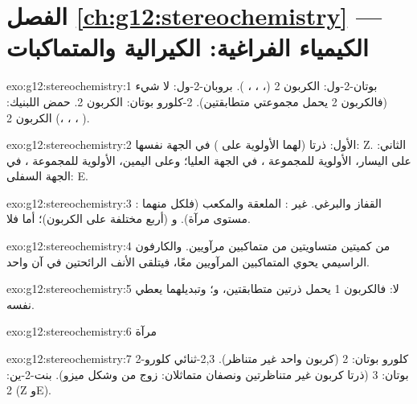 \section*{الفصل \ref{ch:g12:stereochemistry} --- الكيمياء الفراغية: الكيرالية والمتماكبات}

\begin{solution}{exo:g12:stereochemistry:1}
بوتان-2-ول: الكربون 2 (، ، ، ).
بروبان-2-ول: لا شيء (فالكربون 2 يحمل مجموعتي  متطابقتين).
2-كلورو بوتان: الكربون 2. حمض اللبنيك: الكربون 2 (، ،
، ).
\end{solution}

\begin{solution}{exo:g12:stereochemistry:2}
الأول: ذرتا  (لهما الأولوية على ) في الجهة نفسها: Z.
الثاني: على اليسار، الأولوية للمجموعة ، في الجهة العليا؛ وعلى اليمين،
الأولوية للمجموعة ، في الجهة السفلى: E.
\end{solution}

\begin{solution}{exo:g12:stereochemistry:3}
: القفاز والبرغي. غير : الملعقة والمكعب (فلكل منهما
مستوى مرآة). و  (أربع  مختلفة على الكربون)؛
أما  فلا.
\end{solution}

\begin{solution}{exo:g12:stereochemistry:4}
 من كميتين متساويتين من متماكبين مرآويين. والكارفون الراسيمي يحوي
المتماكبين المرآويين معًا، فيتلقى الأنف الرائحتين في آن واحد.
\end{solution}

\begin{solution}{exo:g12:stereochemistry:5}
لا: فالكربون 1 يحمل ذرتين متطابقتين،  و؛ وتبديلهما
يعطي  نفسه.
\end{solution}

\begin{solution}{exo:g12:stereochemistry:6}
 \quad مرآة
\quad {}
\end{solution}

\begin{solution}{exo:g12:stereochemistry:7}
2-كلورو بوتان: 2 (كربون واحد غير متناظر). 2,3-ثنائي كلورو بوتان: 3 (ذرتا
كربون غير متناظرتين ونصفان متماثلان: زوج من  وشكل
ميزو). بنت-2-ين: 2 (Z وE).
\end{solution}

